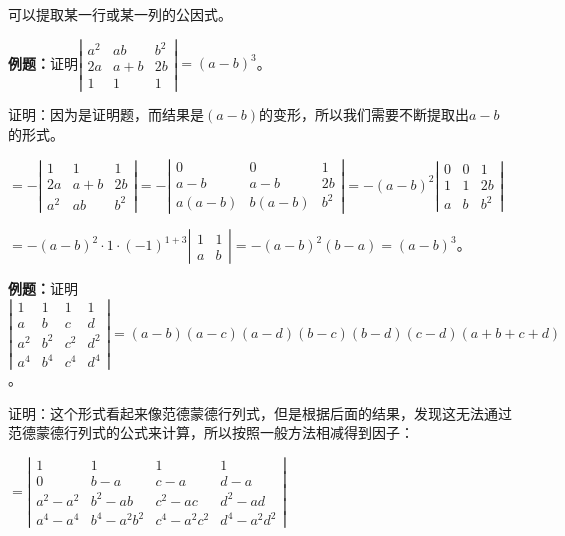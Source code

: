 可以提取某一行或某一列的公因式。

\textbf{例题：}证明$\left|\begin{array}{ccc} 
    a^2 & ab & b^2 \\
    2a & a+b & 2b \\
    1 & 1 & 1
\end{array}\right|=(a-b)^3$。

证明：因为是证明题，而结果是$(a-b)$的变形，所以我们需要不断提取出$a-b$的形式。

$=-\left|\begin{array}{ccc} 
    1 & 1 & 1 \\
    2a & a+b & 2b \\
    a^2 & ab & b^2
\end{array}\right|
=-\left|\begin{array}{ccc} 
    0 & 0 & 1 \\
    a-b & a-b & 2b \\
    a(a-b) & b(a-b) & b^2
\end{array}\right|
=-(a-b)^2\left|\begin{array}{ccc} 
    0 & 0 & 1 \\
    1 & 1 & 2b \\
    a & b & b^2
\end{array}\right|$

$=-(a-b)^2\cdot1\cdot(-1)^{1+3}\left|\begin{array}{cc} 
    1 & 1 \\
    a & b
\end{array}\right|=-(a-b)^2(b-a)=(a-b)^3$。

\textbf{例题：}证明$\left|\begin{array}{cccc} 
    1 & 1 & 1 & 1 \\
    a & b & c & d \\
    a^2 & b^2 & c^2 & d^2 \\
    a^4 & b^4 & c^4 & d^4
\end{array}\right|=(a-b)(a-c)(a-d)(b-c)(b-d)(c-d)(a+b+c+d)$。

证明：这个形式看起来像范德蒙德行列式，但是根据后面的结果，发现这无法通过范德蒙德行列式的公式来计算，所以按照一般方法相减得到因子：

$=\left|\begin{array}{cccc} 
    1 & 1 & 1 & 1 \\
    0 & b-a & c-a & d-a \\
    a^2-a^2 & b^2-ab & c^2-ac & d^2-ad \\
    a^4-a^4 & b^4-a^2b^2 & c^4-a^2c^2 & d^4-a^2d^2
\end{array}\right|$

